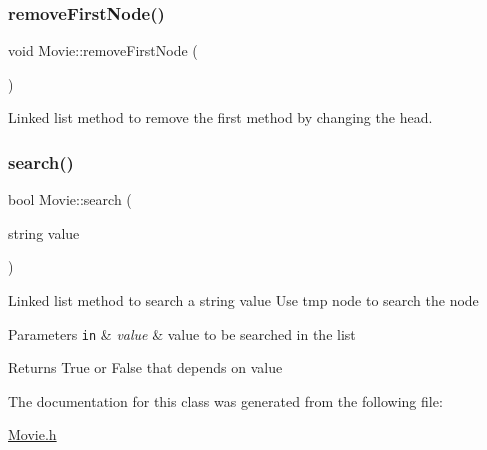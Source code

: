 \subsubsection{\texorpdfstring{remove\+First\+Node()}{removeFirstNode()}}
{\footnotesize\ttfamily void Movie\+::remove\+First\+Node (\begin{DoxyParamCaption}{ }\end{DoxyParamCaption})\hspace{0.3cm}{\ttfamily [inline]}}

Linked list method to remove the first method by changing the head. \mbox{\label{classMovie_adf12d6f970ce999431b200deb2cd96e6}} 
\subsubsection{\texorpdfstring{search()}{search()}}
{\footnotesize\ttfamily bool Movie\+::search (\begin{DoxyParamCaption}\item[{string}]{value }\end{DoxyParamCaption})\hspace{0.3cm}{\ttfamily [inline]}}

Linked list method to search a string value Use tmp node to search the node 
\begin{DoxyParams}[1]{Parameters}
\mbox{\tt in}  & {\em value} & value to be searched in the list \\
\hline
\end{DoxyParams}
\begin{DoxyReturn}{Returns}
True or False that depends on value 
\end{DoxyReturn}


The documentation for this class was generated from the following file\+:\begin{DoxyCompactItemize}
\item 
\hyperlink{Movie_8h}{Movie.\+h}\end{DoxyCompactItemize}
